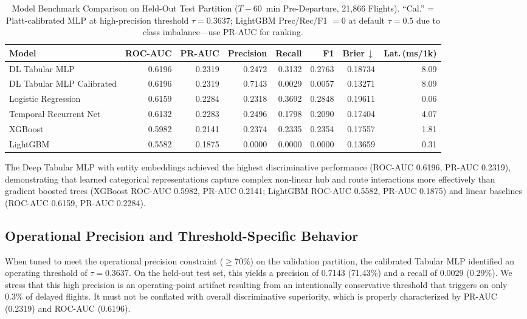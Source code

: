 \documentclass[conference]{IEEEtran}
\begin{document}
\begin{table}[!t]
\renewcommand{\arraystretch}{1.2}
\caption{Model Benchmark Comparison on Held-Out Test Partition ($T - 60$~min Pre-Departure, 21,866 Flights).
  ``Cal.'' = Platt-calibrated MLP at high-precision threshold $\tau = 0.3637$; LightGBM Prec/Rec/F1 $= 0$ at default $\tau=0.5$ due to class imbalance---use PR-AUC for ranking.}
\label{tab:benchmark}
\centering
\setlength{\tabcolsep}{7pt}
\begin{tabular}{@{}l r r r r r r r@{}}
\toprule
\textbf{Model} &
  \textbf{ROC-AUC} &
  \textbf{PR-AUC} &
  \textbf{Precision} &
  \textbf{Recall} &
  \textbf{F1} &
  \textbf{Brier\,$\downarrow$} &
  \textbf{Lat.\,(ms/1k)} \\
\midrule
DL Tabular MLP & \mbox{0.6196} & \mbox{0.2319} & \mbox{0.2472} & \mbox{0.3132} & \mbox{0.2763} & \mbox{0.18734} & \mbox{8.09} \\
DL Tabular MLP Calibrated & \mbox{0.6196} & \mbox{0.2319} & \mbox{0.7143} & \mbox{0.0029} & \mbox{0.0057} & \mbox{0.13271} & \mbox{8.09} \\
Logistic Regression & \mbox{0.6159} & \mbox{0.2284} & \mbox{0.2318} & \mbox{0.3692} & \mbox{0.2848} & \mbox{0.19611} & \mbox{0.06} \\
Temporal Recurrent Net & \mbox{0.6132} & \mbox{0.2283} & \mbox{0.2496} & \mbox{0.1798} & \mbox{0.2090} & \mbox{0.17404} & \mbox{4.07} \\
XGBoost & \mbox{0.5982} & \mbox{0.2141} & \mbox{0.2374} & \mbox{0.2335} & \mbox{0.2354} & \mbox{0.17557} & \mbox{1.81} \\
LightGBM & \mbox{0.5582} & \mbox{0.1875} & \mbox{0.0000} & \mbox{0.0000} & \mbox{0.0000} & \mbox{0.13659} & \mbox{0.31} \\
\bottomrule
\end{tabular}
\end{table}

The Deep Tabular MLP with entity embeddings achieved the highest discriminative performance (ROC-AUC \mbox{0.6196}, PR-AUC \mbox{0.2319}), demonstrating that learned categorical representations capture complex non-linear hub and route interactions more effectively than gradient boosted trees (XGBoost ROC-AUC \mbox{0.5982}, PR-AUC \mbox{0.2141}; LightGBM ROC-AUC \mbox{0.5582}, PR-AUC \mbox{0.1875}) and linear baselines (ROC-AUC \mbox{0.6159}, PR-AUC \mbox{0.2284}).

\subsection{Operational Precision and Threshold-Specific Behavior}
When tuned to meet the operational precision constraint ($\ge 70\%$) on the validation partition, the calibrated Tabular MLP identified an operating threshold of $\tau = 0.3637$. On the held-out test set, this yields a precision of \mbox{0.7143} (\mbox{71.43\%}) and a recall of \mbox{0.0029} (\mbox{0.29\%}). We stress that this high precision is an operating-point artifact resulting from an intentionally conservative threshold that triggers on only \mbox{0.3\%} of delayed flights. It must not be conflated with overall discriminative superiority, which is properly characterized by PR-AUC (\mbox{0.2319}) and ROC-AUC (\mbox{0.6196}).
\end{document}
